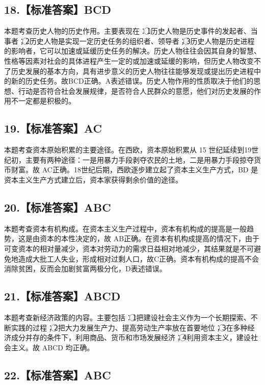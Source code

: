 \documentclass[UTF8,11pt]{ctexart}
\begin{document}
\subsection*{18.【标准答案】BCD}

本题考查历史人物的历史作用。主要表现在：\textcircled{1}历史人物是历史事件的发起者、当事者；\textcircled{2}历史人物是实现一定历史任务的组织者、领导者；\textcircled{3}历史人物是历史进程的影响者，它可以加速或延缓历史任务的解决。历史人物往往会因其自身的智慧、性格等因素对社会的具体进程产生一定的或加速或延缓的影响，但历史人物改变不了历史发展的基本方向，具有进步意义的历史人物往往能够发现或提出历史进程中的新的历史任务。故BCD正确。A表述错误。历史人物作用的性质取决于他们的思想、行动是否符合社会发展规律，是否符合人民群众的意愿，他们对历史发展的作用不一定都是积极的。


\subsection*{19.【标准答案】AC}

本题考查资本原始积累的主要途径。在西欧，资本原始积累从 15 世纪延续到19世纪初，主要有两种途径：一是用暴力手段剥夺农民的土地，二是用暴力手段掠夺货币财富。故 AC正确。18世纪后期，西欧逐步建立起了资本主义生产方式，BD 是资本主义生产方式建立后，资本家获得剩余价值的途径。


\subsection*{20.【标准答案】ABC}

本题考查资本有机构成。在资本主义生产过程中，资本有机构成的提高是一般趋势，这是由资本的本性决定的，故 AB正确。在资本有机构成提高的情况下，由于可变资本的相对量减少，资本对劳动力的需求日益相对地减少，其结果就是不可避免地造成大批工人失业，形成相对过剩人口，故C正确。资本有机构成的提高不会消除贫困，反而会加剧贫富两极分化，D表述错误。


\subsection*{21.【标准答案】ABCD}

本题考查新经济政策的内容。主要包括：\textcircled{1}把建设社会主义作为一个长期探索、不断实践的过程；\textcircled{2}把大力发展生产力、提高劳动生产率放在首要地位；\textcircled{3}在多种经济成分并存的条件下，利用商品、货币和市场发展经济；\textcircled{4}利用资本主义，建设社会主义。故 ABCD 均正确。


\subsection*{22.【标准答案】ABC}
\end{document}
